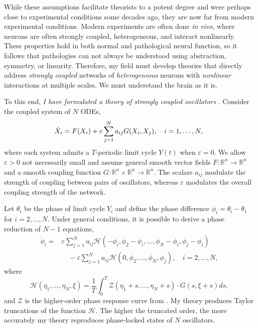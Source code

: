 \documentclass[a4paper,11pt]{article}
\newcommand{\ve}{\varepsilon}
\newcommand{\h}{\mathcal{H}}
\begin{document}
While these assumptions facilitate theorists to a potent degree and were perhaps close to experimental conditions some decades ago, they are now far from modern experimental conditions. Modern experiments are often done \textit{in vivo}, where neurons are often strongly coupled, heterogeneous, and interact nonlinearly. These properties hold in both normal and pathological neural function, so it follows that pathologies can not always be understood using abstraction, symmetry, or linearity. Therefore, my field must develop theories that directly address \textit{strongly coupled} networks of \textit{heterogeneous} neurons with \textit{nonlinear} interactions at multiple scales. We must understand the brain as it is.

To this end, \textit{I have formulated a theory of strongly coupled oscillators} \cite{park2020high}. Consider the coupled system of $N$ ODEs,
\begin{equation}\label{eq:odes}
	\dot X_i = F(X_i) +\ve \sum_{j=1}^N a_{ij} G(X_i,X_j), \quad i=1,\ldots,N,\\
\end{equation}
where each system admits a $T$-periodic limit cycle $Y(t)$ when $\ve=0$. We allow $\ve>0$ not necessarily small and assume general smooth vector fields $F:\mathbb{R}^n \rightarrow \mathbb{R}^n$ and a smooth coupling function $G:\mathbb{R}^n\times\mathbb{R}^n\rightarrow \mathbb{R}^n$. The scalars $a_{ij}$ modulate the strength of coupling between pairs of oscillators, whereas $\ve$ modulates the overall coupling strength of the network.

Let $\theta_i$ be the phase of limit cycle $Y_i$ and define the phase difference $\phi_i=\theta_i-\theta_1$ for $i=2,\ldots,N$. Under general conditions, it is possible to derive a phase reduction of $N-1$ equations,
\begin{align*}
	\dot \phi_i =& \ve\sum_{j=1}^N a_{ij} \h(-\phi_i,\phi_2-\phi_i,\ldots,\phi_N-\phi_i,\phi_j-\phi_i)\\
	&\quad- \ve\sum_{j=1}^N a_{ij} \h(0,\phi_2,\ldots,\phi_N,\phi_j), \quad i=2,\ldots,N,
\end{align*}
where
\begin{equation*}
	\h(\eta_1,\ldots,\eta_N,\xi) = \frac{1}{T} \int_0^T \mathcal{Z}(\eta_1+s,\ldots,\eta_N+s) \cdot G(s,\xi+s)ds,
\end{equation*}
and $\mathcal{Z}$ is the higher-order phase response curve from \cite{wilson2020phase}. My theory produces Taylor truncations of the function $\h$. The higher the truncated order, the more accurately my theory reproduces phase-locked states of $N$ oscillators.
\end{document}
